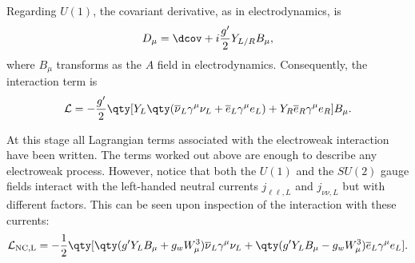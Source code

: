Regarding $U(1)$, the covariant derivative, as in electrodynamics, is
\begin{equation}
    D_\mu = \dcov +i\frac{g'}{2}Y_{L/R} B_\mu,
\end{equation}
where $B_\mu$ transforms as the $A$ field in electrodynamics. Consequently, the interaction term is
\begin{equation}
    \mathcal{L} = -\frac{g'}{2}\qty[Y_{L}\qty(\overline{\nu}_L\gamma^\mu \nu_L+\overline{e}_L\gamma^\mu e_L)+Y_R\overline{e}_R\gamma^\mu e_R]B_\mu.
\end{equation}

At this stage all Lagrangian terms associated with the electroweak interaction have been written. The terms worked out above are enough to describe any electroweak process. However, notice that both the $U(1)$ and the $SU(2)$ gauge fields interact with the left-handed neutral currents $j_{\ell\ell,L}$ and $j_{\nu\nu,L}$ but with different factors. This can be seen upon inspection of the interaction with these currents:
\begin{equation}\label{eq:NC-lag}
    \mathcal{L}_\text{NC,L} = -\frac{1}{2}\qty[\qty(g'Y_LB_\mu+g_w W_\mu^3)\overline{\nu}_L\gamma^\mu \nu_L+\qty(g'Y_LB_\mu-g_w W_\mu^3)\overline{e}_L\gamma^\mu e_L].
\end{equation}

